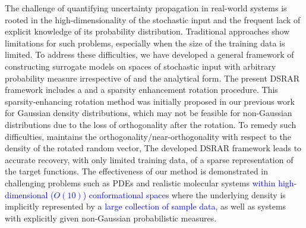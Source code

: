 The challenge of quantifying uncertainty propagation in real-world systems is 
rooted in the high-dimensionality of the stochastic input and the frequent lack 
of explicit knowledge of its probability distribution. Traditional approaches 
show limitations for such problems, especially when the size of the training data is limited.
To address these difficulties, we have developed a general framework of constructing 
surrogate models on spaces of stochastic input with arbitrary probability measure 
irrespective of  and the analytical form.
The present \acf*{DSRAR} framework 
includes a  and a sparsity enhancement rotation procedure.
This sparsity-enhancing rotation method was initially proposed in our previous work \cite{Lei_Yang_MMS_2015} 
for Gaussian density distributions, which may not be feasible for non-Gaussian distributions due 
to the loss of orthogonality after the rotation. To remedy such difficulties,  maintains the orthogonality/near-orthogonality 
with respect to the density of the rotated random vector,    
The developed \acs*{DSRAR} framework leads to accurate recovery, with only limited training data, of a sparse representation 
of the target functions. 
The effectiveness of our method is demonstrated in challenging problems such as \aclp*{PDE} and realistic molecular systems 
\textcolor{blue}{within high-dimensional ($O(10)$) conformational spaces} where the underlying density is implicitly represented by a \textcolor{blue}{large collection of sample data}, as well as systems {with explicitly given} non-Gaussian probabilistic measures.

